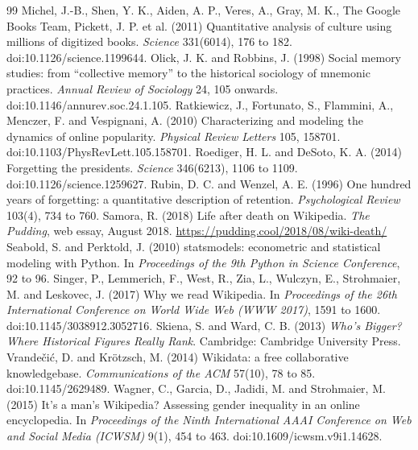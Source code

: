 \documentclass[11pt,a4paper]{article}
\begin{document}
\begin{thebibliography}{99}
 Michel, J.-B., Shen, Y. K., Aiden, A. P., Veres, A., Gray, M. K., The Google Books Team, Pickett, J. P. et al. (2011) Quantitative analysis of culture using millions of digitized books. \textit{Science} 331(6014), 176 to 182. doi:10.1126/science.1199644.
 Olick, J. K. and Robbins, J. (1998) Social memory studies: from ``collective memory'' to the historical sociology of mnemonic practices. \textit{Annual Review of Sociology} 24, 105 onwards. doi:10.1146/annurev.soc.24.1.105.
 Ratkiewicz, J., Fortunato, S., Flammini, A., Menczer, F. and Vespignani, A. (2010) Characterizing and modeling the dynamics of online popularity. \textit{Physical Review Letters} 105, 158701. doi:10.1103/PhysRevLett.105.158701.
 Roediger, H. L. and DeSoto, K. A. (2014) Forgetting the presidents. \textit{Science} 346(6213), 1106 to 1109. doi:10.1126/science.1259627.
 Rubin, D. C. and Wenzel, A. E. (1996) One hundred years of forgetting: a quantitative description of retention. \textit{Psychological Review} 103(4), 734 to 760.
 Samora, R. (2018) Life after death on Wikipedia. \textit{The Pudding}, web essay, August 2018. \url{https://pudding.cool/2018/08/wiki-death/}
 Seabold, S. and Perktold, J. (2010) statsmodels: econometric and statistical modeling with Python. In \textit{Proceedings of the 9th Python in Science Conference}, 92 to 96.
 Singer, P., Lemmerich, F., West, R., Zia, L., Wulczyn, E., Strohmaier, M. and Leskovec, J. (2017) Why we read Wikipedia. In \textit{Proceedings of the 26th International Conference on World Wide Web (WWW 2017)}, 1591 to 1600. doi:10.1145/3038912.3052716.
 Skiena, S. and Ward, C. B. (2013) \textit{Who's Bigger? Where Historical Figures Really Rank}. Cambridge: Cambridge University Press.
 Vrandečić, D. and Krötzsch, M. (2014) Wikidata: a free collaborative knowledgebase. \textit{Communications of the ACM} 57(10), 78 to 85. doi:10.1145/2629489.
 Wagner, C., Garcia, D., Jadidi, M. and Strohmaier, M. (2015) It's a man's Wikipedia? Assessing gender inequality in an online encyclopedia. In \textit{Proceedings of the Ninth International AAAI Conference on Web and Social Media (ICWSM)} 9(1), 454 to 463. doi:10.1609/icwsm.v9i1.14628.

\end{thebibliography}
\end{document}
